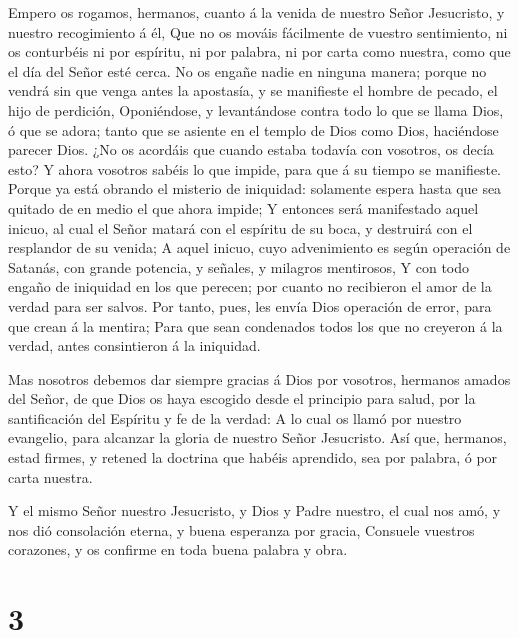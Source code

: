  Empero os rogamos, hermanos, cuanto á la venida de nuestro
Señor Jesucristo, y nuestro recogimiento á él,  Que no os
mováis fácilmente de vuestro sentimiento, ni os conturbéis ni por
espíritu, ni por palabra, ni por carta como nuestra, como que el día del
Señor esté cerca.  No os engañe nadie en ninguna manera;
porque no vendrá sin que venga antes la apostasía, y se manifieste el
hombre de pecado, el hijo de perdición,  Oponiéndose, y
levantándose contra todo lo que se llama Dios, ó que se adora; tanto que
se asiente en el templo de Dios como Dios, haciéndose parecer Dios.
 ¿No os acordáis que cuando estaba todavía con vosotros, os
decía esto?  Y ahora vosotros sabéis lo que impide, para que
á su tiempo se manifieste.  Porque ya está obrando el
misterio de iniquidad: solamente espera hasta que sea quitado de en
medio el que ahora impide;  Y entonces será manifestado
aquel inicuo, al cual el Señor matará con el espíritu de su boca, y
destruirá con el resplandor de su venida;  A aquel inicuo,
cuyo advenimiento es según operación de Satanás, con grande potencia, y
señales, y milagros mentirosos,  Y con todo engaño de
iniquidad en los que perecen; por cuanto no recibieron el amor de la
verdad para ser salvos.  Por tanto, pues, les envía Dios
operación de error, para que crean á la mentira;  Para que
sean condenados todos los que no creyeron á la verdad, antes
consintieron á la iniquidad.

 Mas nosotros debemos dar siempre gracias á Dios por
vosotros, hermanos amados del Señor, de que Dios os haya escogido desde
el principio para salud, por la santificación del Espíritu y fe de la
verdad:  A lo cual os llamó por nuestro evangelio, para
alcanzar la gloria de nuestro Señor Jesucristo.  Así que,
hermanos, estad firmes, y retened la doctrina que habéis aprendido, sea
por palabra, ó por carta nuestra.

 Y el mismo Señor nuestro Jesucristo, y Dios y Padre
nuestro, el cual nos amó, y nos dió consolación eterna, y buena
esperanza por gracia,  Consuele vuestros corazones, y os
confirme en toda buena palabra y obra.

\hypertarget{section-2}{%
\section{3}\label{section-2}}

